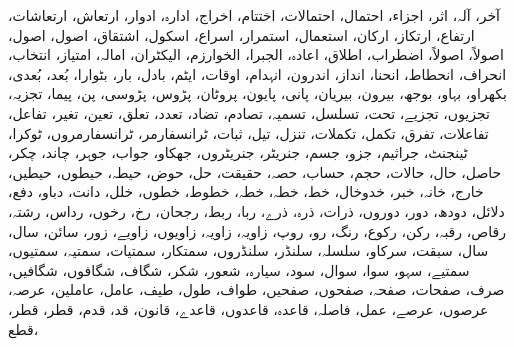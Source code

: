 آخر،               آلہ،               اثر،            اجزاء،            احتمال،            احتمالات،            اختتام،            اخراج،            ادارہ،            ادوار،            ارتعاش،            ارتعاشات،            ارتفاع،            ارتکاز،            ارکان،            استعمال،            استمرار،            اسراع،            اسکول،            اشتقاق،            اصول،            اصول،            اصولاً،            اصولاً،            اضطراب،            اطلاق،            اعادہ،            الجبرا،            الخوارزم،            الیکٹران،            امالہ،            امتیاز،            انتخاب،            انحراف،            انحطاط،            انحنا،            انداز،            اندرون،            انہدام،            اوقات،            ایٹم،            بادل،            بار،            بٹوارا،            بُعد،            بُعدی،            بکھراو،            بہاو،            بوجھ،            بیرون،            بیریان،            پانی،            پایون،            پروٹان،            پڑوس،            پڑوسی،            پن،            پیما،            تجزیہ،            تجزیوں،            تجزیے،            تحت،            تسلسل،            تسمیہ،            تصادم،            تضاد،            تعدد،            تعلق،            تعین،            تغیر،            تفاعل،            تفاعلات،            تفرق،            تکمل،            تکملات،            تنزل،            تیل،            ثبات،            ٹرانسفارمر،            ٹرانسفارمروں،            ٹوکرا،            ٹینجنٹ،            جراثیم،            جزو،            جسم،            جنریٹر،            جنریٹروں،            جھکاو،            جواب،            جوہر،            چاند،            چکر،            حاصل،            حال،            حالات،            حجم،            حساب،            حصہ،            حقیقت،            حل،            حوض،            حیطہ،            حیطوں،            حیطیں،            خارج،            خانہ،            خبر،            خدوخال،            خط،            خطہ،            خطہ،            خطوط،            خطوں،            خلل،            دانت،            دباو،            دفع،            دلائل،            دودھ،            دور،            دوروں،            ذرات،            ذرہ،            ذرے،            ربا،            ربط،            رجحان،            رخ،            رخوں،            رداس،            رشتہ،            رقاص،            رقبہ،            رکن،            رکوع،            رنگ،            رو،            روپ،            زاویہ،            زاویہ،            زاویوں،            زاویے،            زور،            سائن،            سال،            سال،            سبقت،            سرکاو،            سلسلہ،            سلنڈر،            سلنڈروں،            سمتکار،            سمتیات،            سمتیہ،            سمتیوں،            سمتیے،            سہو،            سوا،            سوال،            سود،            سیارہ،            شعور،            شکر،            شگاف،            شگافوں،            شگافیں،            صرف،            صفحات،            صفحہ،            صفحوں،            صفحیں،            طواف،            طول،            طیف،            عامل،            عاملین،            عرصہ،            عرصوں،            عرصے،            عمل،            فاصلہ،            قاعدہ،            قاعدوں،            قاعدے،            قانون،            قد،            قدم،            قطر،            قطر،            قطع،  